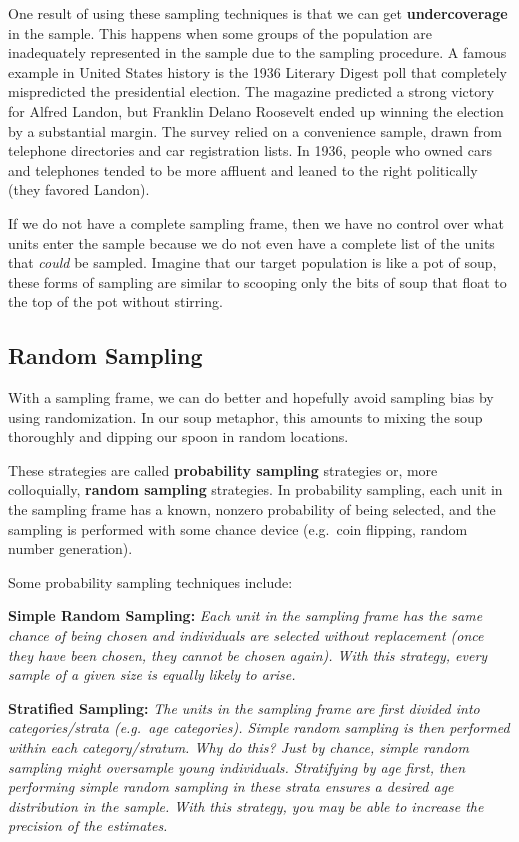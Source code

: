 \documentclass[
]{book}
\begin{document}
One result of using these sampling techniques is that we can get \textbf{undercoverage} in the sample. This happens when some groups of the population are inadequately represented in the sample due to the sampling procedure. A famous example in United States history is the 1936 Literary Digest poll that completely mispredicted the presidential election. The magazine predicted a strong victory for Alfred Landon, but Franklin Delano Roosevelt ended up winning the election by a substantial margin. The survey relied on a convenience sample, drawn from telephone directories and car registration lists. In 1936, people who owned cars and telephones tended to be more affluent and leaned to the right politically (they favored Landon).

If we do not have a complete sampling frame, then we have no control over what units enter the sample because we do not even have a complete list of the units that \emph{could} be sampled. Imagine that our target population is like a pot of soup, these forms of sampling are similar to scooping only the bits of soup that float to the top of the pot without stirring.

\hypertarget{random-sampling}{%
\subsection{Random Sampling}\label{random-sampling}}

With a sampling frame, we can do better and hopefully avoid sampling bias by using randomization. In our soup metaphor, this amounts to mixing the soup thoroughly and dipping our spoon in random locations.

These strategies are called \textbf{probability sampling} strategies or, more colloquially, \textbf{random sampling} strategies. In probability sampling, each unit in the sampling frame has a known, nonzero probability of being selected, and the sampling is performed with some chance device (e.g.~coin flipping, random number generation).

Some probability sampling techniques include:

\textbf{Simple Random Sampling:} \emph{Each unit in the sampling frame has the same chance of being chosen and individuals are selected without replacement (once they have been chosen, they cannot be chosen again). With this strategy, every sample of a given size is equally likely to arise.}

\textbf{Stratified Sampling:} \emph{The units in the sampling frame are first divided into categories/strata (e.g.~age categories). Simple random sampling is then performed within each category/stratum. Why do this? Just by chance, simple random sampling might oversample young individuals. Stratifying by age first, then performing simple random sampling in these strata ensures a desired age distribution in the sample. With this strategy, you may be able to increase the precision of the estimates.}
\end{document}
